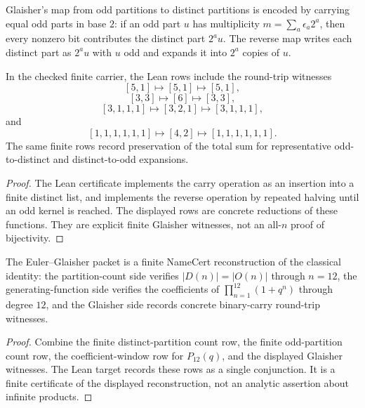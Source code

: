 \begin{theorem}
\label{thm:euler-distinct-odd-partition-glaisher-witnesses}
Glaisher's map from odd partitions to distinct partitions is encoded by carrying equal odd parts in base $2$: if an odd part $u$ has multiplicity $m=\sum_a \epsilon_a2^a$, then every nonzero bit contributes the distinct part $2^a u$. The reverse map writes each distinct part as $2^a u$ with $u$ odd and expands it into $2^a$ copies of $u$.

In the checked finite carrier, the Lean rows include the round-trip witnesses
$$
[5,1]\mapsto [5,1]\mapsto [5,1],
$$
$$
[3,3]\mapsto [6]\mapsto [3,3],
$$
$$
[3,1,1,1]\mapsto [3,2,1]\mapsto [3,1,1,1],
$$
and
$$
[1,1,1,1,1,1]\mapsto [4,2]\mapsto [1,1,1,1,1,1].
$$
The same finite rows record preservation of the total sum for representative odd-to-distinct and distinct-to-odd expansions.
\end{theorem}
\begin{proof}
The Lean certificate implements the carry operation as an insertion into a finite distinct list, and implements the reverse operation by repeated halving until an odd kernel is reached. The displayed rows are concrete reductions of these functions. They are explicit finite Glaisher witnesses, not an all-$n$ proof of bijectivity.
\end{proof}

\begin{theorem}
\label{thm:euler-distinct-odd-partition-namecert-reconstruction}
The Euler--Glaisher packet is a finite NameCert reconstruction of the classical identity: the partition-count side verifies $|D(n)|=|O(n)|$ through $n=12$, the generating-function side verifies the coefficients of $\prod_{n=1}^{12}(1+q^n)$ through degree $12$, and the Glaisher side records concrete binary-carry round-trip witnesses.
\end{theorem}
\begin{proof}
Combine the finite distinct-partition count row, the finite odd-partition count row, the coefficient-window row for $P_{12}(q)$, and the displayed Glaisher witnesses. The Lean target records these rows as a single conjunction. It is a finite certificate of the displayed reconstruction, not an analytic assertion about infinite products.
\end{proof}


